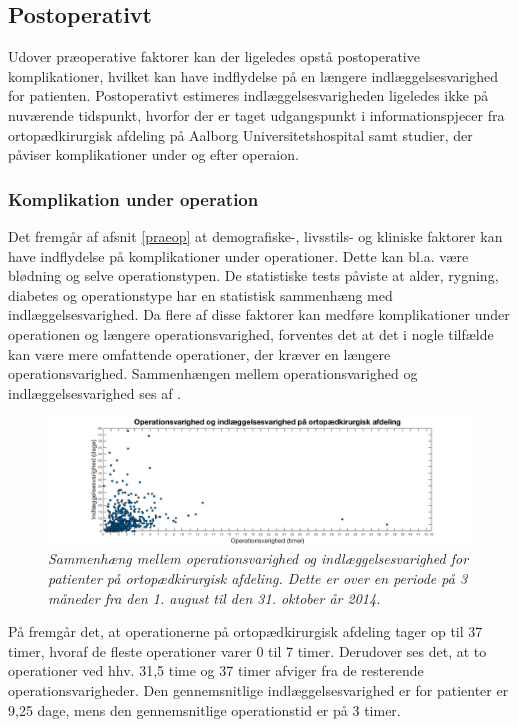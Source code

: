 \subsection{Postoperativt} \label{postop}
Udover præoperative faktorer kan der ligeledes opstå postoperative komplikationer, hvilket kan have indflydelse på en længere indlæggelsesvarighed for patienten. Postoperativt estimeres indlæggelsesvarigheden ligeledes ikke på nuværende tidspunkt, hvorfor der er taget udgangspunkt i informationspjecer fra ortopædkirurgisk afdeling på Aalborg Universitetshospital samt studier, der påviser komplikationer under og efter operaion.

\subsubsection{Komplikation under operation}
Det fremgår af afsnit \ref{praeop} at demografiske-, livsstils- og kliniske faktorer kan have indflydelse på komplikationer under operationer. Dette kan bl.a. være blødning og selve operationstypen. De statistiske tests påviste at alder, rygning, diabetes og operationstype har en statistisk sammenhæng med indlæggelsesvarighed. Da flere af disse faktorer kan medføre komplikationer under operationen og længere operationsvarighed, forventes det at det i nogle tilfælde kan være mere omfattende operationer, der kræver en længere operationsvarighed. Sammenhængen mellem operationsvarighed og indlæggelsesvarighed ses af .


\begin{figure}[H]
	\centering
	\includegraphics[scale=0.35]{figures/opindlaeg.png}
	\caption{\textit{Sammenhæng mellem operationsvarighed og indlæggelsesvarighed for patienter på ortopædkirurgisk afdeling. Dette er over en periode på 3 måneder fra den 1. august til den 31. oktober år 2014.}}
	\label{opindlaeg}
	\end{figure}

\noindent
På  fremgår det, at operationerne på ortopædkirurgisk afdeling tager op til 37 timer, hvoraf de fleste operationer varer 0 til 7 timer. Derudover ses det, at to operationer ved hhv. 31,5 time og 37 timer afviger fra de resterende operationsvarigheder. Den gennemsnitlige indlæggelsesvarighed er for patienter er 9,25 dage, mens den gennemsnitlige operationstid er på 3 timer. 

